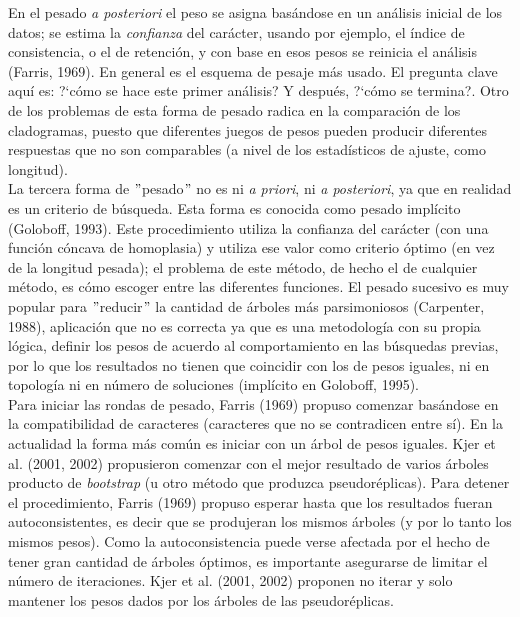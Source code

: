 En el pesado \textit{a posteriori} el peso se asigna bas\'andose en un an\'alisis inicial de los datos; se estima la \textit{confianza} del car\'acter, usando por ejemplo, el \'indice de consistencia, o el de retenci\'on, y con base en esos pesos se reinicia el an\'alisis (Farris, 1969). En general es el esquema de pesaje m\'as usado. El pregunta clave aqu\'i es: ?`c\'omo se hace este primer an\'alisis? Y despu\'es, ?`c\'omo se termina?. Otro de los problemas de esta forma de pesado radica en la comparaci\'on de los cladogramas, puesto que diferentes juegos de pesos pueden producir diferentes respuestas que no son comparables (a nivel de los estad\'isticos de ajuste, como longitud).\\
La tercera forma de $"$pesado$"$ no es ni \textit{a priori}, ni \textit{a posteriori}, ya que en realidad es un criterio de b\'usqueda. Esta forma es conocida como pesado impl\'icito (Goloboff, 1993). Este procedimiento utiliza la confianza del car\'acter (con una funci\'on c\'oncava de homoplasia) y utiliza ese valor como criterio \'optimo (en vez de la longitud pesada); el problema de este m\'etodo, de hecho el de cualquier m\'etodo, es c\'omo escoger entre las diferentes funciones.
El pesado sucesivo es muy popular para $"$reducir$"$ la cantidad de \'arboles m\'as parsimoniosos (Carpenter, 1988), aplicaci\'on que no es correcta ya que es una metodolog\'ia con su propia l\'ogica, definir los pesos de acuerdo al comportamiento en las b\'usquedas previas, por lo que los resultados no tienen que coincidir con los de pesos iguales, ni en topolog\'ia ni en n\'umero de soluciones (impl\'icito en Goloboff, 1995).\\
Para iniciar las rondas de pesado, Farris (1969) propuso comenzar bas\'andose en la compatibilidad de caracteres (caracteres que no se contradicen entre s\'i). En la actualidad la forma m\'as com\'un es iniciar con un \'arbol de pesos iguales. Kjer et al. (2001, 2002) propusieron comenzar con el mejor resultado de varios \'arboles producto de \textit{bootstrap}
 (u otro m\'etodo que produzca pseudor\'eplicas).  Para detener el procedimiento, Farris (1969) propuso esperar hasta que los resultados fueran autoconsistentes, es decir que se produjeran los mismos \'arboles (y por lo tanto los mismos pesos). Como la autoconsistencia puede verse afectada por el hecho de tener gran cantidad de \'arboles \'optimos, es importante asegurarse de limitar el n\'umero de iteraciones. Kjer et al. (2001, 2002) proponen no iterar y solo mantener los pesos dados por los \'arboles de las pseudor\'eplicas.\\
